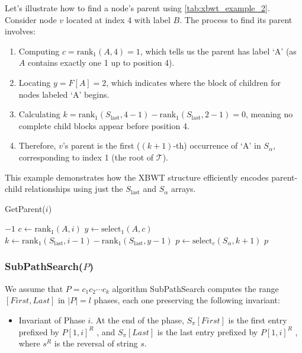 \begin{example}
    Let's illustrate how to find a node's parent using \cref{tab:xbwt_example_2}. Consider node $v$ located at index 4 with label $B$. The process to find its parent involves:
    \begin{enumerate}
        \item Computing $c = \text{rank}_1(A, 4) = 1$, which tells us the parent has label `A' (as $A$ contains exactly one 1 up to position 4).
        \item Locating $y = F[A] = 2$, which indicates where the block of children for nodes labeled `A' begins.
        \item Calculating $k = \text{rank}_1(S_{\text{last}}, 4-1) - \text{rank}_1(S_{\text{last}}, 2-1) = 0$, meaning no complete child blocks appear before position 4.
        \item Therefore, $v$'s parent is the first ($(k+1)$-th) occurrence of `A' in $S_{\alpha}$, corresponding to index 1 (the root of $\mathcal{T}$).
    \end{enumerate}
    This example demonstrates how the XBWT structure efficiently encodes parent-child relationships using just the $S_{\text{last}}$ and $S_{\alpha}$ arrays.
\end{example}

\begin{algorithm}[H]
    \caption{GetParent($i$)}
    \label{alg:getparent}
    \begin{algorithmic}[1]
        \State \Return $-1$ 
    \EndIf
    \State $c \gets \text{rank}_1(A, i)$
    \State $y \gets \text{select}_1(A, c)$
    \State $k \gets \text{rank}_1(S_{\text{last}}, i - 1) - \text{rank}_1(S_{\text{last}}, y - 1)$
    \State $p \gets \text{select}_c(S_\alpha, k + 1)$
    \State \Return $p$
    \end{algorithmic}
\end{algorithm}

\subsubsection*{SubPathSearch($P$)}
We assume that $P = c_1c_2 \cdots c_k$ algorithm SubPathSearch computes the range $[First, Last]$ in $|P| = l$ phases, each one preserving the following invariant:

\begin{itemize}
    \item Invariant of Phase $i$. At the end of the phase, $S_{\pi}[First]$ is the first entry prefixed by $P[1, i]^R$ , and $S_{\pi}[Last]$ is the last entry prefixed by $P[1, i]^R$ , where $s^R$ is the reversal of string $s$.
\end{itemize}

